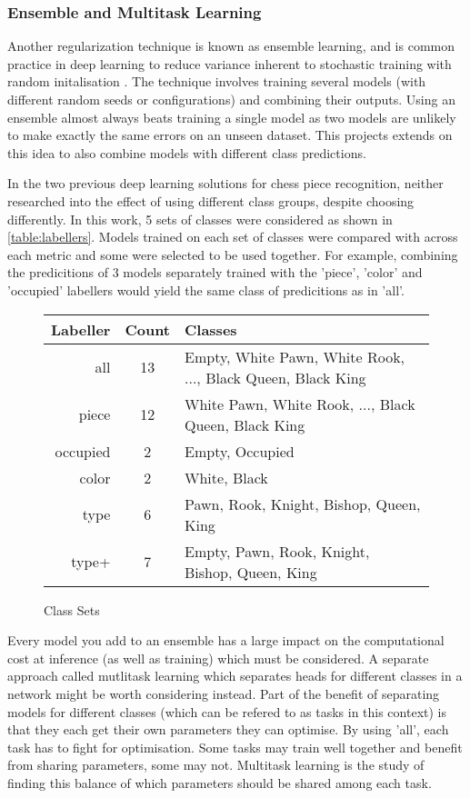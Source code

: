 \subsubsection{Ensemble and Multitask Learning}
Another regularization technique is known as ensemble learning, and is common practice in deep learning to reduce variance inherent to stochastic training 
with random initalisation \cite{deeplearningbook}.  The technique involves training several models (with different random seeds or configurations) and 
combining their outputs. Using an ensemble almost always beats training a single model as two models are unlikely to make exactly the same errors on an unseen dataset.
This projects extends on this idea to also combine models with different class predictions.

In the two previous deep learning solutions for chess piece recognition, neither researched into the effect of using different class groups, 
despite choosing differently.
In this work, 5 sets of classes were considered as shown in \autoref{table:labellers}.  Models trained on each set of classes were compared
with across each metric and some were selected to be used together.  For example, combining the predicitions of 3 models separately trained with
the 'piece', 'color' and 'occupied' labellers would yield the same class of predicitions as in 'all'.
\begin{center}
\begin{figure}
\begin{tabular}{|r|c|l|}
    \hline
    Labeller & Count & Classes \\
    \hline
    all & 13 & Empty, White Pawn, White Rook, ..., Black Queen, Black King \\
    piece & 12 & White Pawn, White Rook, ..., Black Queen, Black King \\
    occupied & 2 & Empty, Occupied \\
    color & 2 & White, Black \\
    type & 6 & Pawn, Rook, Knight, Bishop, Queen, King \\
    type+ & 7 & Empty, Pawn, Rook, Knight, Bishop, Queen, King \\
    \hline
\end{tabular}
\caption{Class Sets}
\label{table:labellers}
\end{figure}
\end{center}

Every model you add to an ensemble has a large impact on the computational cost at inference (as well as training) which must be considered.  A separate
approach called mutlitask learning which separates heads for different classes in a network might be worth considering instead.  
Part of the benefit of separating models for different classes (which can be 
refered to as tasks in this context) is that they each get their own parameters they can optimise.  By using 'all', each task has to fight for optimisation.
Some tasks may train well together and benefit from sharing parameters, some may not.  Multitask learning is the study of finding this balance of which 
parameters should be shared among each task.

